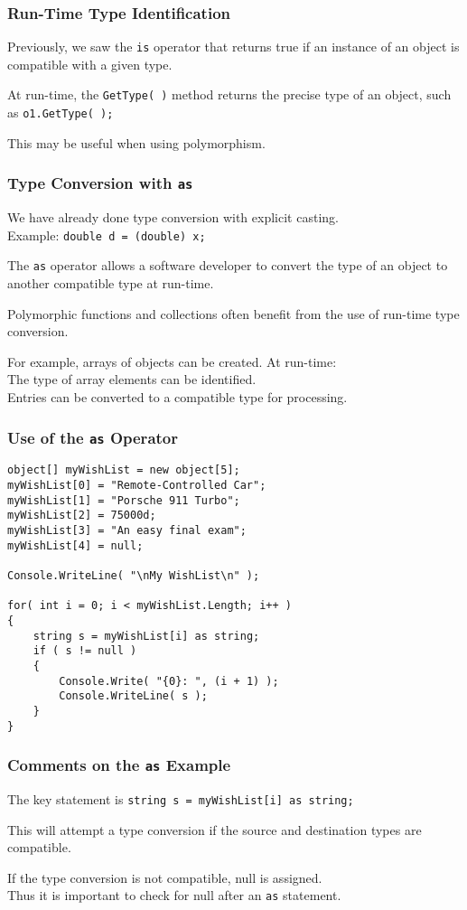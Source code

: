 \begin{frame}
\frametitle{Run-Time Type Identification}
Previously, we saw the \texttt{is} operator that returns true if an instance of an object is compatible with a given type.

At run-time, the \texttt{GetType( )} method returns the precise type of an object, such as \texttt{o1.GetType( );}

This may be useful when using polymorphism.

\end{frame}


\begin{frame}
\frametitle{Type Conversion with \texttt{as}}

We have already done type conversion with explicit casting.\\
\quad Example: \texttt{double d = (double) x;}

The \texttt{as} operator allows a software developer to convert the type of an object to another compatible type at run-time.

Polymorphic functions and collections often benefit from the use of run-time type conversion.

For example, arrays of objects can be created. At run-time:\\
    \quad The type of array elements can be identified.\\
    \quad Entries can be converted to a compatible type for processing.

\end{frame}


\begin{frame}[fragile]
\frametitle{Use of the \texttt{as} Operator}

{\small
\begin{verbatim}
object[] myWishList = new object[5];
myWishList[0] = "Remote-Controlled Car";
myWishList[1] = "Porsche 911 Turbo";
myWishList[2] = 75000d;
myWishList[3] = "An easy final exam";
myWishList[4] = null;

Console.WriteLine( "\nMy WishList\n" );

for( int i = 0; i < myWishList.Length; i++ )
{
    string s = myWishList[i] as string;    
    if ( s != null )
    {
        Console.Write( "{0}: ", (i + 1) );
        Console.WriteLine( s );
    }
}
\end{verbatim}
}

\end{frame}

\begin{frame}
\frametitle{Comments on the \texttt{as} Example}
The key statement is \texttt{string s = myWishList[i] as string;}

This will attempt a type conversion if the source and destination types are compatible.

If the type conversion is not compatible, null is assigned.\\
\quad Thus it is important to check for null after an \texttt{as} statement.

\end{frame}



